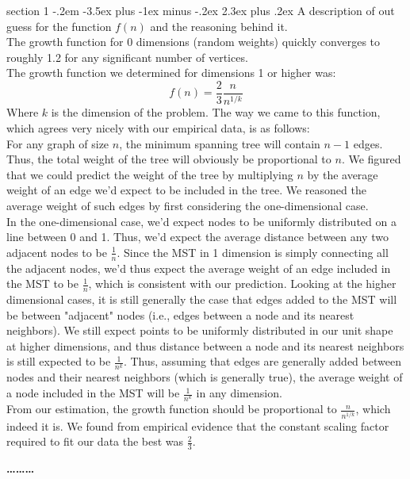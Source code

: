 \documentclass[12pt]{article}
\makeatletter
\newenvironment{problem}{\@startsection
       {section}
       {1}
       {-.2em}
       {-3.5ex plus -1ex minus -.2ex}
       {2.3ex plus .2ex}
       {\pagebreak[3]%
       \large\bf\noindent{Problem }
       }
       }
       {%
       \begin{center}\large\bf \ldots\ldots\ldots\end{center}}
\makeatother
\begin{document}
\begin{problem}{}
A description of out guess for the function $f(n)$ and the reasoning
behind it.\\

\noindent The growth function for 0 dimensions (random weights)
quickly converges to roughly 1.2 for any significant number of vertices.\\

\noindent The growth function we determined for dimensions 1 or higher was:
\begin{equation}
f(n) = \frac{2}{3}\frac{n}{n^{1/k}}
\end{equation}
Where $k$ is the dimension of the problem.  The way we came to this function, which agrees very nicely with our empirical data, is as follows:\\

\noindent For any graph of size $n$, the minimum spanning tree will contain $n-1$ edges.  Thus, the total weight of the tree will obviously be proportional to $n$.  We figured that we could predict the weight of the tree by multiplying $n$ by the average weight of an edge we'd expect to be included in the tree.  We reasoned the average weight of such edges by first considering the one-dimensional case.\\

\noindent In the one-dimensional case, we'd expect nodes to be uniformly distributed on a line between 0 and 1.  Thus, we'd expect the average distance between any two adjacent nodes to be $\frac{1}{n}$.  Since the MST in 1 dimension is simply connecting all the adjacent nodes, we'd thus expect the average weight of an edge included in the MST to be $\frac{1}{n}$, which is consistent with our prediction.  Looking at the higher dimensional cases, it is still generally the case that edges added to the MST will be between "adjacent" nodes (i.e., edges between a node and its nearest neighbors).  We still expect points to be uniformly distributed in our unit shape at higher dimensions, and thus distance between a node and its nearest neighbors is still expected to be $\frac{1}{n^k}$.  Thus, assuming that edges are generally added between nodes and their nearest neighbors (which is generally true), the average weight of a node included in the MST will be $\frac{1}{n^k}$ in any dimension.\\

\noindent From our estimation, the growth function should be proportional to $\frac{n}{n^{1/k}}$, which indeed it is.  We found from empirical evidence that the constant scaling factor required to fit our data the best was $\frac{2}{3}$.\\


\end{problem}
\end{document}
